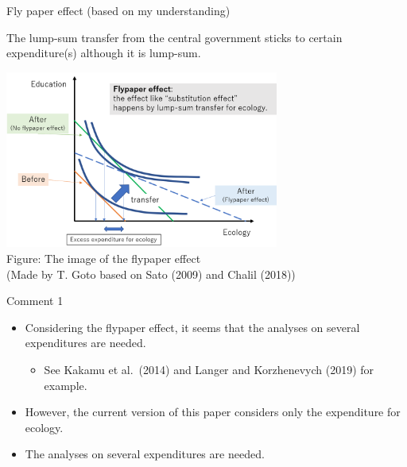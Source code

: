 \documentclass[
  ignorenonframetext,
]{beamer}
\providecommand{\tightlist}{%
  \setlength{\itemsep}{0pt}\setlength{\parskip}{0pt}}
\begin{document}
\begin{frame}{Fly paper effect (based on my understanding)}
\protect\hypertarget{fly-paper-effect-based-on-my-understanding}{}

The lump-sum transfer from the central government sticks to certain
expenditure(s) although it is lump-sum.

\begin{center}
\includegraphics[width=9cm,clip]{figure1.png}\\
Figure: The image of the flypaper effect\\
(Made by T. Goto based on Sato (2009) and Chalil (2018))
\end{center}

\end{frame}

\begin{frame}{Comment 1}
\protect\hypertarget{comment-1}{}

\begin{itemize}
\tightlist
\item
  Considering the flypaper effect, it seems that the analyses on several
  expenditures are needed.

  \begin{itemize}
  \tightlist
  \item
    See Kakamu et al.~(2014) and Langer and Korzhenevych (2019) for
    example.
  \end{itemize}
\item
  However, the current version of this paper considers only the
  expenditure for ecology.
\item
  The analyses on several expenditures are needed.
\end{itemize}

\end{frame}
\end{document}
